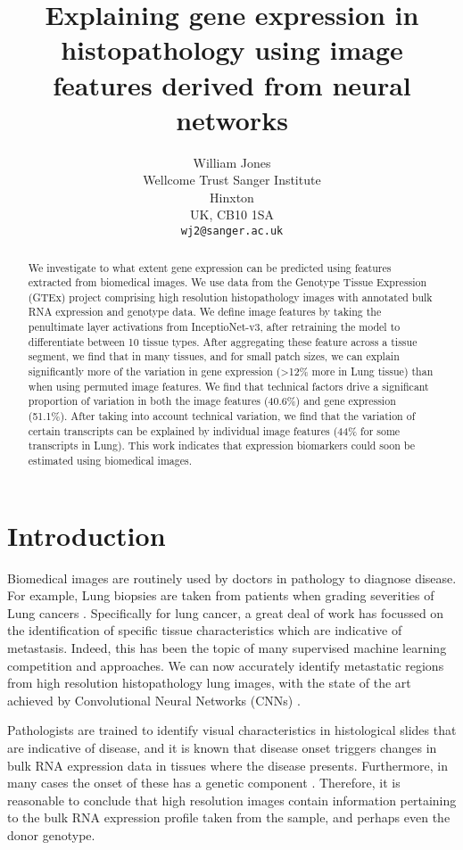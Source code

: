 \documentclass{article}
\title{Explaining gene expression in histopathology using image features derived from neural networks}
\author{
  William Jones\\
  Wellcome Trust Sanger Institute\\
  Hinxton\\
  UK, CB10 1SA \\
  \texttt{wj2@sanger.ac.uk} \\
}
\begin{document}

\maketitle

\begin{abstract}
We investigate to what extent gene expression can be predicted using features extracted from biomedical images. We use data from the Genotype Tissue Expression (GTEx) project comprising high resolution histopathology images with annotated bulk RNA expression and genotype data. We define image features by taking the penultimate layer activations from InceptioNet-v3, after retraining the model to differentiate between 10 tissue types. After aggregating these feature across a tissue segment, we find that in many tissues, and for small patch sizes, we can explain significantly more of the variation in gene expression (>12\% more in Lung tissue) than when using permuted image features. We find that technical factors drive a significant proportion of variation in both the image features (40.6\%) and gene expression (51.1\%). After taking into account technical variation, we find that the variation of certain transcripts can be explained by individual image features (44\% for some transcripts in Lung). This work indicates that expression biomarkers could soon be estimated using biomedical images. \end{abstract}

\section{Introduction}
Biomedical images are routinely used by doctors in pathology to diagnose disease. For example, Lung biopsies are taken from patients when grading severities of Lung cancers \cite{histology-classification-lung-cancer}. Specifically for lung cancer, a great deal of work has focussed on the identification of specific tissue characteristics which are indicative of metastasis. Indeed, this has been the topic of many supervised machine learning competition and approaches. We can now accurately identify metastatic regions from high resolution histopathology lung images, with the state of the art achieved by Convolutional Neural Networks (CNNs) \cite{detecting-cancer-metastases}.

Pathologists are trained to identify visual characteristics in histological slides that are indicative of disease, and it is known that disease onset triggers changes in bulk RNA expression data in tissues where the disease presents. \cite{gene-expression-parkinsons} Furthermore, in many cases the onset of these has a genetic component \cite{what-is-complex-about-complex-disorders}. Therefore, it is reasonable to conclude that high resolution images contain information pertaining to the bulk RNA expression profile taken from the sample, and perhaps even the donor genotype.
\end{document}
